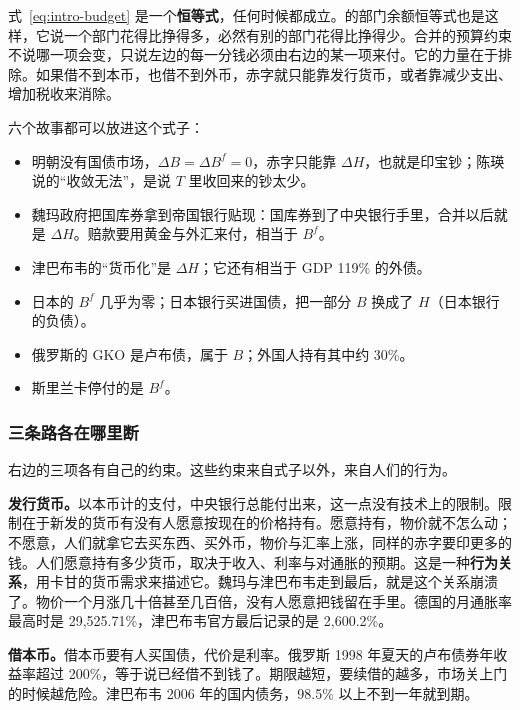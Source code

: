 式~\eqref{eq:intro-budget} 是一个\textbf{恒等式}，任何时候都成立。的部门余额恒等式也是这样，它说一个部门花得比挣得多，必然有别的部门花得比挣得少。合并的预算约束不说哪一项会变，只说左边的每一分钱必须由右边的某一项来付。它的力量在于排除。如果借不到本币，也借不到外币，赤字就只能靠发行货币，或者靠减少支出、增加税收来消除。

六个故事都可以放进这个式子：
\begin{itemize}
\item 明朝没有国债市场，$\Delta B=\Delta B^{f}=0$，赤字只能靠 $\Delta H$，也就是印宝钞；陈瑛说的“收敛无法”，是说 $T$ 里收回来的钞太少。
\item 魏玛政府把国库券拿到帝国银行贴现：国库券到了中央银行手里，合并以后就是 $\Delta H$。赔款要用黄金与外汇来付，相当于 $B^{f}$。
\item 津巴布韦的“货币化”是 $\Delta H$；它还有相当于 GDP 119\% 的外债。
\item 日本的 $B^{f}$ 几乎为零；日本银行买进国债，把一部分 $B$ 换成了 $H$（日本银行的负债）。
\item 俄罗斯的 GKO 是卢布债，属于 $B$；外国人持有其中约 30\%。
\item 斯里兰卡停付的是 $B^{f}$。
\end{itemize}


\subsubsection{三条路各在哪里断}
右边的三项各有自己的约束。这些约束来自式子以外，来自人们的行为。

\textbf{发行货币。}以本币计的支付，中央银行总能付出来，这一点没有技术上的限制。限制在于新发的货币有没有人愿意按现在的价格持有。愿意持有，物价就不怎么动；不愿意，人们就拿它去买东西、买外币，物价与汇率上涨，同样的赤字要印更多的钱。人们愿意持有多少货币，取决于收入、利率与对通胀的预期。这是一种\textbf{行为关系}，用卡甘的货币需求来描述它。魏玛与津巴布韦走到最后，就是这个关系崩溃了。物价一个月涨几十倍甚至几百倍，没有人愿意把钱留在手里。德国的月通胀率最高时是 29,525.71\%，津巴布韦官方最后记录的是 2,600.2\%。

\textbf{借本币。}借本币要有人买国债，代价是利率。俄罗斯 1998 年夏天的卢布债券年收益率超过 200\%，等于说已经借不到钱了。期限越短，要续借的越多，市场关上门的时候越危险。津巴布韦 2006 年的国内债务，98.5\% 以上不到一年就到期\cite{reinhart2008}。

